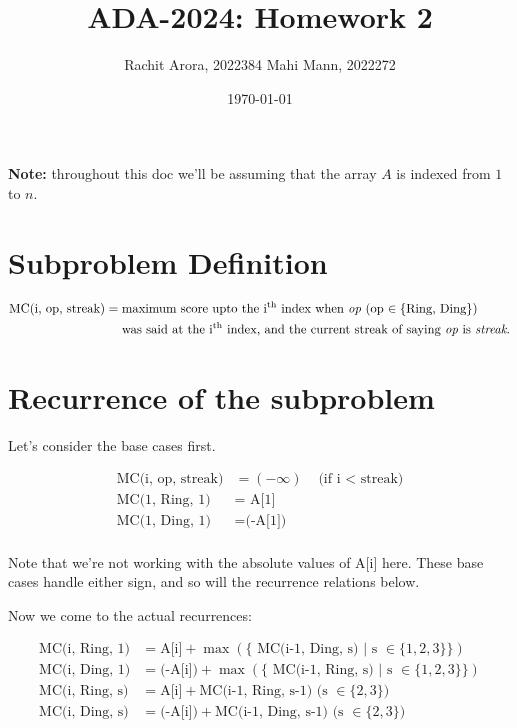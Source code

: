 \documentclass{article}
\title{ADA-2024: Homework 2}
\author{Rachit Arora, 2022384 \cr Mahi Mann, 2022272}
\date{\today}
\begin{document}
\maketitle

\textbf{Note:} throughout this doc we'll be assuming that the array $A$ is indexed from $1$ to $n$.

\section{Subproblem Definition}


\begin{align*}
    \text{MC(i, op, streak)} &= \text{maximum score upto the i\textsuperscript{th} index when \emph{op} (op $\in \{\text{Ring, Ding}\}$)} \\ &\quad \text{ was said at the i\textsuperscript{th} index,
                             and the current streak of saying \emph{op} is \emph{streak}.}
\end{align*}

\section{Recurrence of the subproblem}

Let's consider the base cases first.

\begin{align*}
    \text{MC(i, op, streak)} &= (-\infty) &\text{ (if i $<$ streak)}  \\
    \text{MC(1, Ring, 1)} &= \text{ A[1]} \\ 
    \text{MC(1, Ding, 1)} &= \text{(-A[1])} \\ 
\end{align*} 

Note that we're not working with the absolute values of A[i] here. These base cases handle either sign, and so will the recurrence relations below.

Now we come to the actual recurrences:

\begin{align*}
    \text{MC(i, Ring, 1)} &= \text{A[i]} + \max(\{\text{ MC(i-1, Ding, s) } | \text{ s } \in \{1,2,3\}\}) \\
    \text{MC(i, Ding, 1)} &= \text{(-A[i])} + \max(\{\text{ MC(i-1, Ring, s) } | \text{ s } \in \{1,2,3\}\}) \\
    \text{MC(i, Ring, s)} &= \text{A[i]} + \text{MC(i-1, Ring, s-1) (s $\in \{2,3\}$)} \\ 
    \text{MC(i, Ding, s)} &= \text{(-A[i])} + \text{MC(i-1, Ding, s-1) (s $\in \{2,3\}$)} \\ 
\end{align*}
\end{document}
